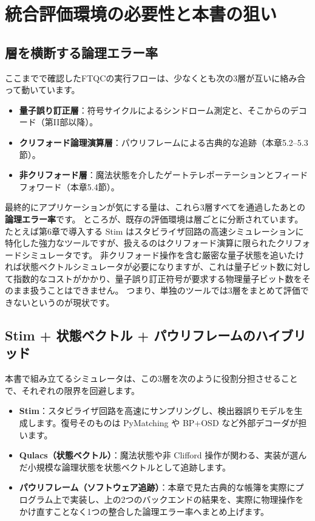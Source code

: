 \section{統合評価環境の必要性と本書の狙い}\label{sec:integrated_sim}

\subsection{層を横断する論理エラー率}

ここまでで確認したFTQCの実行フローは、少なくとも次の3層が互いに絡み合って動いています。

\begin{itemize}
  \item \textbf{量子誤り訂正層}：符号サイクルによるシンドローム測定と、そこからのデコード（第II部以降）。
  \item \textbf{クリフォード論理演算層}：パウリフレームによる古典的な追跡（本章5.2–5.3節）。
  \item \textbf{非クリフォード層}：魔法状態を介したゲートテレポーテーションとフィードフォワード（本章5.4節）。
\end{itemize}

最終的にアプリケーションが気にする量は、これら3層すべてを通過したあとの\textbf{論理エラー率}です。
ところが、既存の評価環境は層ごとに分断されています。
たとえば第6章で導入する Stim はスタビライザ回路の高速シミュレーションに特化した強力なツールですが、扱えるのはクリフォード演算に限られたクリフォードシミュレータです。
非クリフォード操作を含む厳密な量子状態を追いたければ状態ベクトルシミュレータが必要になりますが、これは量子ビット数に対して指数的なコストがかかり、量子誤り訂正符号が要求する物理量子ビット数をそのまま扱うことはできません。
つまり、単独のツールでは3層をまとめて評価できないというのが現状です。

\subsection{Stim + 状態ベクトル + パウリフレームのハイブリッド}

本書で組み立てるシミュレータは、この3層を次のように役割分担させることで、それぞれの限界を回避します。

\begin{itemize}
  \item \textbf{Stim}：スタビライザ回路を高速にサンプリングし、検出器誤りモデルを生成します。復号そのものは PyMatching や BP+OSD など外部デコーダが担います\cite{gidney2021stim}。
  \item \textbf{Qulacs（状態ベクトル）}：魔法状態や非 Clifford 操作が関わる、実装が選んだ小規模な論理状態を状態ベクトルとして追跡します。
  \item \textbf{パウリフレーム（ソフトウェア追跡）}：本章で見た古典的な帳簿を実際にプログラム上で実装し、上の2つのバックエンドの結果を、実際に物理操作をかけ直すことなく1つの整合した論理エラー率へまとめ上げます。
\end{itemize}

